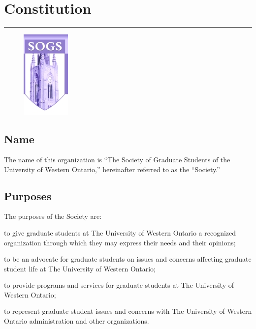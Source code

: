 \chapter{Constitution}
\rule{\textwidth}{0.5pt}\vspace*{--\baselineskip}\vspace{3.2pt} %
\vfill


\begin{figure}
\centering
\includegraphics{logo.jpg}\\[1cm]
\end{figure}




\newpage


\section{Name}

The name of this organization is ``The Society of Graduate Students of the University of Western Ontario,'' hereinafter referred to as the ``Society.''  
 \newpage

\section{Purposes}

The purposes of the Society are:

	\begin{longenum}[ label*=\thesection.\arabic*., align=left]

 \item to give graduate students at The University of Western Ontario a recognized organization through which they may express their needs and their opinions;

 \item to be an advocate for graduate students on issues and concerns affecting graduate student life at The University of Western Ontario; 

 \item to provide programs and services for graduate students at The University of Western Ontario; 

 \item to represent graduate student issues and concerns with The University of Western Ontario administration and other organizations.
   \end{longenum}

